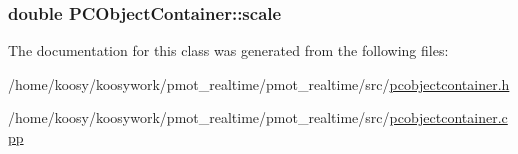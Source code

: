 \hypertarget{class_p_c_object_container_af11c2139d36c285b66b3b56ac5b3f96e}{
\subsubsection[{scale}]{\setlength{\rightskip}{0pt plus 5cm}double {\bf \-P\-C\-Object\-Container\-::scale}}}\label{class_p_c_object_container_af11c2139d36c285b66b3b56ac5b3f96e}


\-The documentation for this class was generated from the following files\-:\begin{DoxyCompactItemize}
\item 
/home/koosy/koosywork/pmot\-\_\-realtime/pmot\-\_\-realtime/src/\hyperlink{pcobjectcontainer_8h}{pcobjectcontainer.\-h}\item 
/home/koosy/koosywork/pmot\-\_\-realtime/pmot\-\_\-realtime/src/\hyperlink{pcobjectcontainer_8cpp}{pcobjectcontainer.\-cpp}\end{DoxyCompactItemize}
